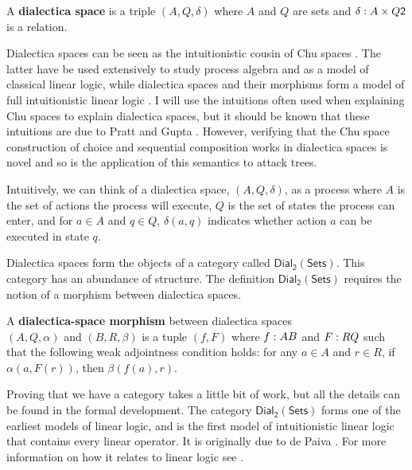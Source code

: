 \documentclass{llncs}
\let\to\relax
\newcommand{\to}{\rightarrow}
\newcommand{\dial}[0]{\mathsf{Dial_2}(\mathsf{Sets})}
\begin{document}
\begin{definition}
  \label{def:dialectica-space}
  A \textbf{dialectica space} is a triple $(A, Q, \delta)$ where $A$
  and $Q$ are sets and $\delta : A \times Q \to \mathsf{2}$ is a
  relation.
\end{definition}
Dialectica spaces can be seen as the intuitionistic cousin
\cite{dePaiva:2006b} of Chu spaces \cite{Pratt:1999}.  The latter have
be used extensively to study process algebra and as a model of
classical linear logic, while dialectica spaces and their morphisms
form a model of full intuitionistic linear logic \cite{?}. I will use
the intuitions often used when explaining Chu spaces to explain
dialectica spaces, but it should be known that these intuitions are
due to Pratt and Gupta \cite{?}.  However, verifying that the Chu
space construction of choice and sequential composition works in
dialectica spaces is novel and so is the application of this semantics
to attack trees.

Intuitively, we can think of a dialectica space, $(A , Q, \delta)$, as
a process where $A$ is the set of actions the process will execute,
$Q$ is the set of states the process can enter, and for $a \in A$ and
$q \in Q$, $\delta(a , q)$ indicates whether action $a$ can be
executed in state $q$.  

Dialectica spaces form the objects of a category called $\dial$.  This
category has an abundance of structure.  The definition $\dial$
requires the notion of a morphism between dialectica spaces.
\begin{definition}
  \label{def:dial-space-morphism}
  A \textbf{dialectica-space morphism} between dialectica spaces
  \\ $(A , Q, \alpha)$ and $(B , R , \beta)$ is a tuple $(f, F)$ where
  $f : A \to B$ and $F : R \to Q$ such that the following weak
  adjointness condition holds:
    for any $a \in A$ and $r \in R$, if $\alpha(a,F(r))$, then
    $\beta(f(a), r)$. 
\end{definition}
Proving that we have a category takes a little bit of work, but all
the details can be found in the formal development.  The category
$\dial$ forms one of the earliest models of linear logic, and is the
first model of intuitionistic linear logic that contains every linear
operator. It is originally due to de Paiva \cite{?}. For more
information on how it relates to linear logic see \cite{Eades:2016}.
\end{document}
